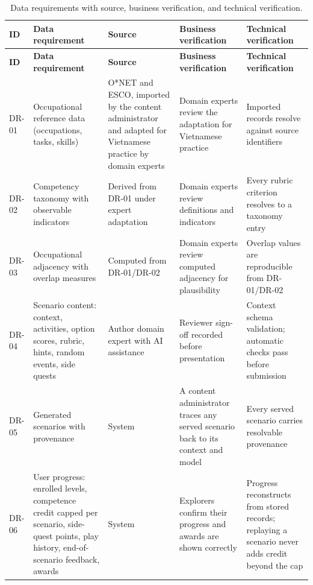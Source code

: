 {\small
\begin{longtable}{|>{\raggedright\arraybackslash}p{}|>{\raggedright\arraybackslash}p{}|>{\raggedright\arraybackslash}p{}|>{\raggedright\arraybackslash}p{}|>{\raggedright\arraybackslash}p{}|}
\caption{Data requirements with source, business verification, and technical verification.} \\
\hline
\textbf{ID} & \textbf{Data requirement} & \textbf{Source} & \textbf{Business verification} & \textbf{Technical verification} \\ \hline
\endfirsthead
\hline
\textbf{ID} & \textbf{Data requirement} & \textbf{Source} & \textbf{Business verification} & \textbf{Technical verification} \\ \hline
\endhead
DR-01 & Occupational reference data (occupations, tasks, skills) & O*NET and ESCO, imported by the content administrator and adapted for Vietnamese practice by domain experts & Domain experts review the adaptation for Vietnamese practice & Imported records resolve against source identifiers \\ \hline
DR-02 & Competency taxonomy with observable indicators & Derived from DR-01 under expert adaptation & Domain experts review definitions and indicators & Every rubric criterion resolves to a taxonomy entry \\ \hline
DR-03 & Occupational adjacency with overlap measures & Computed from DR-01/DR-02 & Domain experts review computed adjacency for plausibility & Overlap values are reproducible from DR-01/DR-02 \\ \hline
DR-04 & Scenario content: context, activities, option scores, rubric, hints, random events, side quests & Author domain expert with AI assistance & Reviewer sign-off recorded before presentation & Context schema validation; automatic checks pass before submission \\ \hline
DR-05 & Generated scenarios with provenance & System & A content administrator traces any served scenario back to its context and model & Every served scenario carries resolvable provenance \\ \hline
DR-06 & User progress: enrolled levels, competence credit capped per scenario, side-quest points, play history, end-of-scenario feedback, awards & System & Explorers confirm their progress and awards are shown correctly & Progress reconstructs from stored records; replaying a scenario never adds credit beyond the cap \\ \hline

\end{longtable}}
